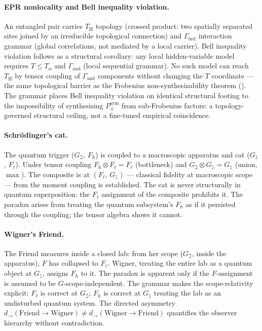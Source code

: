 \documentclass[12pt,a4paper]{article}
\newcommand{\Ppms}{P_{\pm}^{\text{sym}}}
\newcommand{\tensor}{\otimes}
\newcommand{\Tbw}{T_{\mathord{\bowtie}}}
\newcommand{\Tbox}{T_{\mathord{\boxtimes}}}
\begin{document}
\paragraph{EPR nonlocality and Bell inequality violation.}
An entangled pair carries $\Tbox$ topology (crossed product: two spatially separated
sites joined by an irreducible topological connection) and $\Gamma_\text{brd}$
interaction grammar (global correlations, not mediated by a local carrier).  Bell
inequality violation follows as a structural corollary: any local hidden-variable
model requires $T \leq \Tbw$ and $\Gamma_\text{and}$ (local sequential grammar).
No such model can reach $\Tbox$ by tensor coupling of $\Gamma_\text{and}$ components
without changing the $T$ coordinate --- the same topological barrier as the Frobenius
non-synthesizability theorem ().  The grammar places Bell
inequality violation on identical structural footing to the impossibility of
synthesising $\Ppms$ from sub-Frobenius factors: a topology-governed structural
ceiling, not a fine-tuned empirical coincidence.

\paragraph{Schrödinger's cat.}
The quantum trigger ($G_\beth$, $F_\hbar$) is coupled to a macroscopic apparatus
and cat ($G_\gimel$, $F_\ell$).  Under tensor coupling $F_\hbar \tensor F_\ell =
F_\ell$ (bottleneck) and $G_\beth \tensor G_\gimel = G_\gimel$ (union, $\max$).
The composite is at $(F_\ell,\, G_\gimel)$ --- classical fidelity at macroscopic scope
--- from the moment coupling is established.  The cat is never structurally in
quantum superposition: the $F_\ell$ assignment of the composite prohibits it.
The paradox arises from treating the quantum subsystem's $F_\hbar$ as if it persisted
through the coupling; the tensor algebra shows it cannot.

\paragraph{Wigner's Friend.}
The Friend measures inside a closed lab: from her scope ($G_\beth$, inside the
apparatus), $F$ has collapsed to $F_\ell$.  Wigner, treating the entire lab as a
quantum object at $G_\gimel$, assigns $F_\hbar$ to it.  The paradox is apparent only
if the $F$-assignment is assumed to be $G$-scope-independent.  The grammar makes the
scope-relativity explicit: $F_\ell$ is correct at $G_\beth$; $F_\hbar$ is correct at
$G_\gimel$ treating the lab as an undisturbed quantum system.  The directed asymmetry
$d_\to(\text{Friend} \to \text{Wigner}) \neq d_\to(\text{Wigner} \to \text{Friend})$
quantifies the observer hierarchy without contradiction.
\end{document}
